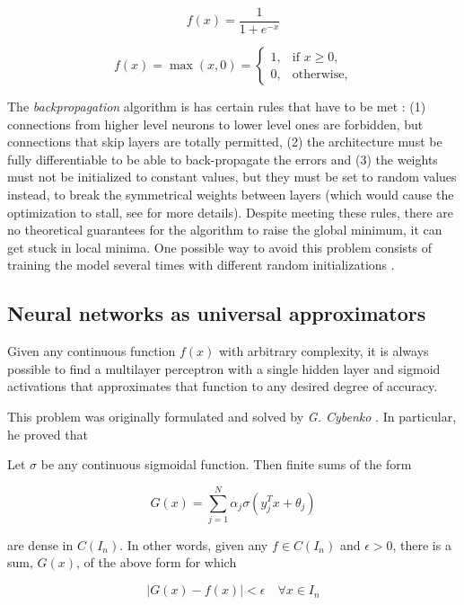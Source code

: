 \begin{equation}
\label{eq:sigmoid}
f(x) = \frac{1}{1+e^{-x}}
\end{equation}

\begin{equation}
\label{eq:relu}
f(x) = \max(x, 0) =
\begin{cases}
1,          & \text{if } x \geq 0 ,\\
0,         & \text{otherwise},
\end{cases}
\end{equation}

The \textit{backpropagation} algorithm is has certain rules that have to be met \cite{hinton1986}: (1) connections from higher level neurons to lower level ones are forbidden, but connections that skip layers are totally permitted, (2) the architecture must be fully differentiable to be able to back-propagate the errors and (3) the weights must not be initialized to constant values, but they must be set to random values instead, to break the symmetrical weights between layers (which would cause the optimization to stall, see \cite{hinton1986} for more details). Despite meeting these rules, there are no theoretical guarantees for the algorithm to raise the global minimum, it can get stuck in local minima. One possible way to avoid this problem consists of training the model several times with different random initializations \cite{haykin1998}.

\subsection{Neural networks as universal approximators}
Given any continuous function $f(x)$ with arbitrary complexity, it is always possible to find a multilayer perceptron with a single hidden layer and sigmoid activations that approximates that function to any desired degree of accuracy. 

This problem was originally formulated and solved by \textit{G. Cybenko} \cite{Cybenko1989}. In particular, he proved that

\begin{thm}[ 2 - Cybenko, 1989]
	Let $\sigma$ be any continuous sigmoidal function. Then finite sums of the form
	
	$$ G(x) = \sum_{j=1}^{N} \alpha_j \sigma(y_j^Tx + \theta_j) $$
	
	are dense in $C(I_n)$. In other words, given any $f \in C(I_n)$ and $\epsilon > 0$, there is a sum, $G(x)$, of the above form for which 
	
	$$|G(x) - f(x)| < \epsilon \quad \forall x \in I_n$$
\end{thm}

